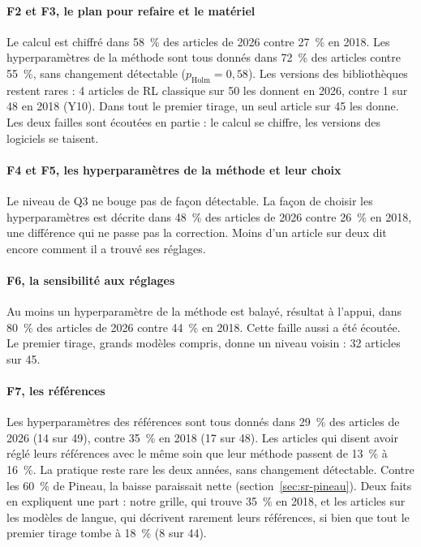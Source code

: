 \paragraph{F2 et F3, le plan pour refaire et le matériel}
Le calcul est chiffré dans 58~\% des articles de 2026 contre 27~\% en 2018. Les hyperparamètres de la
méthode sont tous donnés dans 72~\% des articles contre 55~\%, sans changement détectable
($p_{\text{Holm}} = 0{,}58$). Les versions des bibliothèques restent rares : 4 articles de RL classique
sur 50 les donnent en 2026, contre 1 sur 48 en 2018 (Y10). Dans tout le premier tirage, un seul article
sur 45 les donne. Les deux failles sont écoutées en partie : le calcul se chiffre, les versions des
logiciels se taisent.

\paragraph{F4 et F5, les hyperparamètres de la méthode et leur choix}
Le niveau de Q3 ne bouge pas de façon détectable. La façon de choisir les hyperparamètres est décrite
dans 48~\% des articles de 2026 contre 26~\% en 2018, une différence qui ne passe pas la correction. Moins
d'un article sur deux dit encore comment il a trouvé ses réglages.

\paragraph{F6, la sensibilité aux réglages}
Au moins un hyperparamètre de la méthode est balayé, résultat à l'appui, dans 80~\% des articles de
2026 contre 44~\% en 2018. Cette faille aussi a été écoutée. Le premier tirage, grands modèles compris, donne un
niveau voisin : 32 articles sur 45.

\paragraph{F7, les références}
Les hyperparamètres des références sont tous donnés dans 29~\% des articles de 2026 (14 sur 49), contre
35~\% en 2018 (17 sur 48). Les articles qui disent avoir réglé leurs références avec le même soin que
leur méthode passent de 13~\% à 16~\%. La pratique reste rare les deux années, sans changement
détectable. Contre les 60~\% de Pineau, la baisse paraissait nette (section~\ref{sec:sr-pineau}). Deux
faits en expliquent une part : notre grille, qui trouve 35~\% en 2018, et les articles sur les modèles de
langue, qui décrivent rarement leurs références, si bien que tout le premier tirage tombe à 18~\% (8 sur
44).

